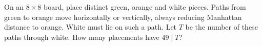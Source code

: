 On an $8\times8$ board, place distinct green, orange and white pieces. Paths from green to orange move horizontally or vertically, always reducing Manhattan distance to orange. White must lie on such a path. Let $T$ be the number of these paths through white. How many placements have $49\mid T$?
